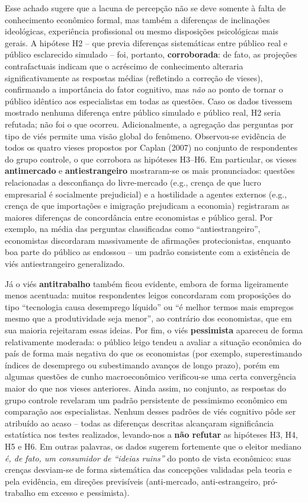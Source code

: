 Esse achado sugere que a lacuna de percepção não se deve somente à falta de conhecimento econômico formal, mas também a diferenças de inclinações ideológicas, experiência profissional ou mesmo disposições psicológicas mais gerais. A hipótese H2 – que previa diferenças sistemáticas entre público real e público esclarecido simulado – foi, portanto, \textbf{corroborada}: de fato, as projeções contrafactuais indicam que o acréscimo de conhecimento alteraria significativamente as respostas médias (refletindo a correção de vieses), confirmando a importância do fator cognitivo, mas \textit{não} ao ponto de tornar o público idêntico aos especialistas em todas as questões. Caso os dados tivessem mostrado nenhuma diferença entre público simulado e público real, H2 seria refutada; não foi o que ocorreu. Adicionalmente, a agregação das perguntas por tipo de viés permite uma visão global do fenômeno. Observou-se evidência de todos os quatro vieses propostos por Caplan (2007) no conjunto de respondentes do grupo controle, o que corrobora as hipóteses H3–H6. Em particular, os vieses \textbf{antimercado} e \textbf{antiestrangeiro} mostraram-se os mais pronunciados: questões relacionadas a desconfiança do livre-mercado (e.g., crença de que lucro empresarial é socialmente prejudicial) e a hostilidade a agentes externos (e.g., crença de que importações e imigração prejudicam a economia) registraram as maiores diferenças de concordância entre economistas e público geral. Por exemplo, na média das perguntas classificadas como “antiestrangeiro”, economistas discordaram massivamente de afirmações protecionistas, enquanto boa parte do público as endossou -- um padrão consistente com a existência de viés antiestrangeiro generalizado. 

Já o viés \textbf{antitrabalho} também ficou evidente, embora de forma ligeiramente menos acentuada: muitos respondentes leigos concordaram com proposições do tipo “tecnologia causa desemprego líquido” ou “é melhor termos mais empregos mesmo que a produtividade seja menor”, ao contrário dos economistas, que em sua maioria rejeitaram essas ideias. Por fim, o viés \textbf{pessimista} apareceu de forma relativamente moderada: o público leigo tendeu a avaliar a situação econômica do país de forma mais negativa do que os economistas (por exemplo, superestimando índices de desemprego ou subestimando avanços de longo prazo), porém em algumas questões de cunho macroeconômico verificou-se uma certa convergência maior do que nos vieses anteriores. Ainda assim, no conjunto, as respostas do grupo controle revelaram um padrão persistente de pessimismo econômico em comparação aos especialistas. Nenhum desses padrões de viés cognitivo pôde ser atribuído ao acaso -- todas as diferenças descritas alcançaram significância estatística nos testes realizados, levando-nos a \textbf{não refutar} as hipóteses H3, H4, H5 e H6. Em outras palavras, os dados sugerem fortemente que o eleitor mediano \emph{é, de fato, um consumidor de “ideias ruins”} do ponto de vista econômico: suas crenças desviam-se de forma sistemática das concepções validadas pela teoria e pela evidência, em direções previsíveis (anti-mercado, anti-estrangeiro, pró-trabalho em excesso e pessimista). 


